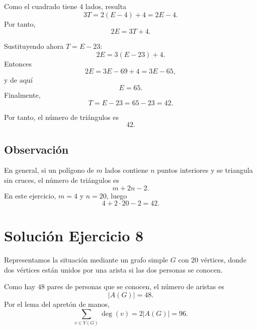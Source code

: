 \documentclass[12pt]{article}
\begin{document}
Como el cuadrado tiene \(4\) lados, resulta
\[
3T = 2(E-4)+4 = 2E-4.
\]
Por tanto,
\[
2E=3T+4.
\]

Sustituyendo ahora \(T=E-23\):
\[
2E=3(E-23)+4.
\]
Entonces
\[
2E=3E-69+4=3E-65,
\]
y de aquí
\[
E=65.
\]
Finalmente,
\[
T=E-23=65-23=42.
\]

Por tanto, el número de triángulos es
\[
\boxed{42}.
\]

\subsection*{Observación}

En general, si un polígono de \(m\) lados contiene \(n\) puntos interiores y se triangula sin cruces, el número de triángulos es
\[
m+2n-2.
\]
En este ejercicio, \(m=4\) y \(n=20\), luego
\[
4+2\cdot 20-2=42.
\]

\section*{Solución Ejercicio 8}

Representamos la situación mediante un grafo simple \(G\) con \(20\) vértices, donde dos vértices están unidos por una arista si las dos personas se conocen.

Como hay \(48\) pares de personas que se conocen, el número de aristas es
\[
|A(G)|=48.
\]
Por el lema del apretón de manos,
\[
\sum_{v\in V(G)} \deg(v)=2|A(G)|=96.
\]
\end{document}
